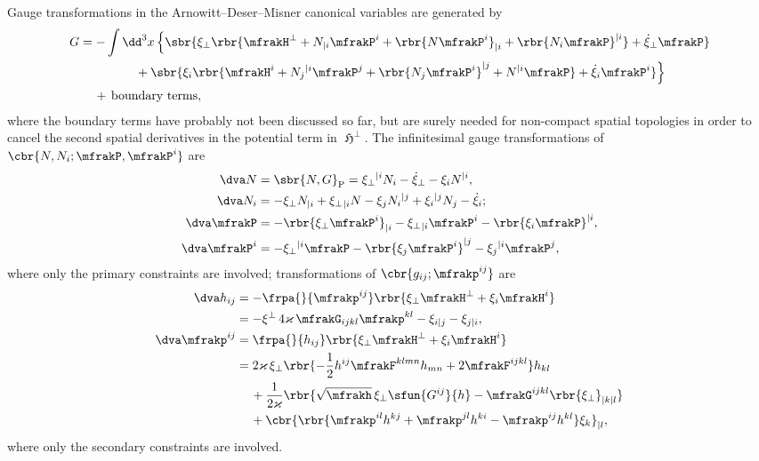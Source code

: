 \documentclass[a4paper,11pt]{article}
\begin{document}
Gauge transformations in the Arnowitt--Deser--Misner canonical variables are 
generated by \cite{Castellani1982} 
\begin{align}
G &= -\int\dd^3 x\,\Big\{ \sbr{
	\xi_\perp \rbr{
		\mfrakH^\perp + N_{|i} \mfrakP^i + \rbr{N\mfrakP^i}_{|i} + 
			\rbr{N_i \mfrakP}^{|i}} +
	\dot{\xi}_\perp \mfrakP}
\nonumber \\
&\qquad\qquad\ \,+ \sbr{
	\xi_i \rbr{
		\mfrakH^i + N_j{}^{|i} \mfrakP^j + \rbr{N_j \mfrakP^i}^{|j} + N^{|i} 
\mfrakP} +
	\dot{\xi}_i \mfrakP^i} \Big\}
\nonumber \\
&\quad\,
+\,\text{boundary terms},
\end{align}
where the boundary terms have probably not been discussed so far, but are 
surely needed for non-compact spatial topologies in order to cancel the second 
spatial derivatives in the potential term in $\mfrakH^\perp$. The infinitesimal 
gauge transformations of $\cbr{N, N_i; \mfrakP, \mfrakP^i}$ are 
\cite{Kiriushcheva2008}
\begin{align}
\dva N &= \sbr{N, G}_\text{P} = 
\xi_\perp{}^{|i} N_i - \dot{\xi}_\perp - \xi_i N^{|i},
\label{eq:var-Np} \\
\dva N_i &= %
- \xi_\perp N_{|i} + \xi_\perp{}_{|i} N
- \xi_j N_{i}{}^{|j} + \xi_i{}^{|j} N_j - \dot{\xi}_i;
\label{eq:var-Ni} \\
\dva \mfrakP &= -\rbr{\xi_\perp \mfrakP^i}_{|i} - \xi_\perp{}_{|i} \mfrakP^i
- \rbr{\xi_i \mfrakP}^{|i},
\label{eq:var-Pp} \\
\dva \mfrakP^i &= -\xi_\perp{}^{|i} \mfrakP
- \rbr{\xi_j \mfrakP^i}^{|j} - \xi_j{}^{|i}\mfrakP^j,
\label{eq:var-Pi}
\end{align}
where only the primary constraints are involved; transformations of 
$\cbr{g_{ij}; \mfrakp^{ij}}$ are
\begin{align}
\dva h_{ij} &= -\frpa{}{\mfrakp^{ij}}
\rbr{\xi_\perp \mfrakH^\perp + \xi_i \mfrakH^i}
\nonumber \\
&= -\xi^\perp\,4\varkappa\,\mfrakG_{ijkl}\mfrakp^{kl}
- \xi_{i|j} - \xi_{j|i},
\label{eq:var-hij}
\\
\dva \mfrakp^{ij} &= \frpa{}{h_{ij}}
\rbr{\xi_\perp \mfrakH^\perp + \xi_i \mfrakH^i}
\nonumber \\
&=
2\varkappa\,\xi_\perp\rbr{ -\frac{1}{2}h^{ij} \mfrakF^{klmn} h_{mn}
+ 2 \mfrakF^{ijkl}} h_{kl}
\nonumber \\
&\quad\,
+\frac{1}{2\varkappa}
\rbr{ \sqrt{\mfrakh}\,\xi_\perp\sfun{G^{ij}}{h}
-\mfrakG^{ijkl}\rbr{\xi_{\perp}}_{|k|l}}
\nonumber \\
&\quad\,
+\cbr{\rbr{\mfrakp^{il}h^{kj}+\mfrakp^{jl}h^{ki}
-\mfrakp^{ij}h^{kl}}\xi_k}_{|l},
\label{eq:var-pij}
\end{align}
where
only the secondary constraints are involved. 
\end{document}
